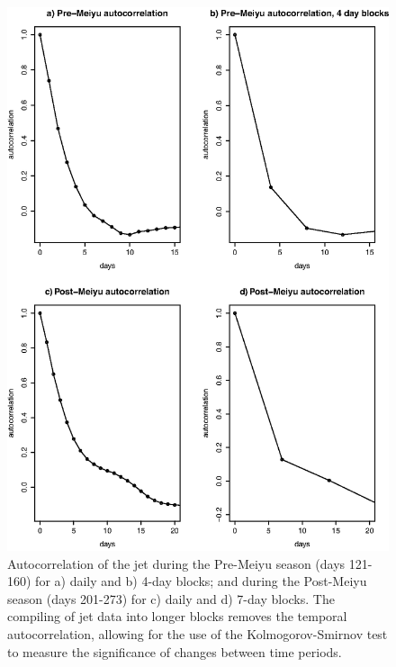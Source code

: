 \documentclass[draft,grl]{agutexSI}
\begin{document}
\begin{article}
\begin{figure}

\noindent\includegraphics[width=36pc]{Figures/S5}
\caption{Autocorrelation of the jet during the Pre-Meiyu season (days 121-160) for a) daily and b) 4-day blocks; and during the Post-Meiyu season (days 201-273) for c) daily and d) 7-day blocks. The compiling of jet data into longer blocks removes the temporal autocorrelation, allowing for the use of the Kolmogorov-Smirnov test to measure the significance of changes between time periods.}
\end{figure}

\end{article}
\end{document}
